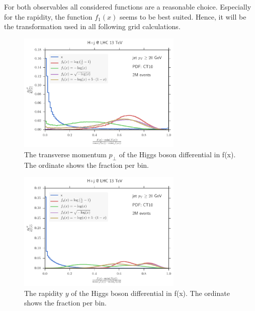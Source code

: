 For both observables all considered functions are a reasonable choice.
Especially for the rapidity, the function $f_1(x)$ seems to be best suited.
Hence, it will be the transformation used in all following grid calculations.
%
\begin{figure}[]
	\includegraphics[width=0.7\textwidth]{images/hpt_compare.pdf}
	\caption{The transverse momentum $p_\perp$ of the Higgs boson differential in f(x).
				The ordinate shows the fraction per bin.}
	\label{fig:hpt_compare}
\end{figure}
%
%
\begin{figure}[]
	\includegraphics[width=0.7\textwidth]{images/hy_compare.pdf}
	\caption{The rapidity $y$ of the Higgs boson differential in f(x).
				The ordinate shows the fraction per bin.}
	\label{fig:hy_compare}
\end{figure}
%
